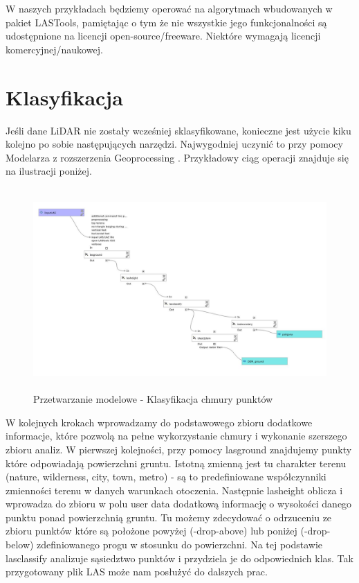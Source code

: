 \documentclass[12pt,a4paper]{book}
\begin{document}
W naszych przykładach będziemy operować na algorytmach wbudowanych w pakiet LASTools, pamiętając o tym że nie wszystkie jego funkcjonalności są udostępnione na licencji open-source/freeware. Niektóre wymagają licencji komercyjnej/naukowej.

\section{Klasyfikacja}
Jeśli dane LiDAR nie zostały wcześniej sklasyfikowane, konieczne jest użycie kiku kolejno po sobie następujących narzędzi. Najwygodniej uczynić to przy pomocy Modelarza z rozszerzenia  Geoprocessing . Przykładowy ciąg operacji znajduje się na ilustracji poniżej.



\begin{center}
\begin{figure}
\includegraphics[width=13cm,height=7.691cm]{005-model-chmura.jpg}
\caption{Przetwarzanie modelowe - Klasyfikacja chmury punktów}
\end{figure}
\end{center}
W kolejnych krokach wprowadzamy do podstawowego zbioru dodatkowe informacje, które pozwolą na pełne wykorzystanie chmury i wykonanie szerszego zbioru analiz. W pierwszej kolejności, przy pomocy  lasground  znajdujemy punkty które odpowiadają powierzchni gruntu. Istotną zmienną jest tu charakter terenu (nature, wilderness, city, town, metro) - są to predefiniowane współczynniki zmienności terenu w danych warunkach otoczenia. Następnie  lasheight  oblicza i wprowadza do zbioru w polu  user data  dodatkową informację o wysokości danego punktu ponad powierzchnią gruntu. Tu możemy zdecydować o odrzuceniu ze zbioru punktów które są położone powyżej (-drop-above) lub poniżej (-drop-below) zdefiniowanego progu w stosunku do powierzchni. Na tej podstawie  lasclassify  analizuje sąsiedztwo punktów i przydziela je do odpowiednich klas. Tak przygotowany plik LAS może nam posłużyć do dalszych prac.
\end{document}
